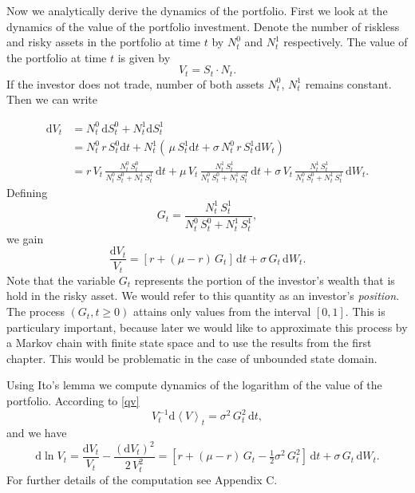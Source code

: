 Now we analytically derive the dynamics of the portfolio. First we look at the dynamics of the value of the portfolio investment. Denote the number of riskless and risky assets in the portfolio at time $t$ by $N^0_t$ and $N^1_t$ respectively. The value of the portfolio at time $t$ is given by
\[V_t=S_t\cdot N_t.\]
If the investor does not trade, number of both assets $N^0_t$, $N^1_t$ remains constant. Then we can write 

\begin{align*}
\mathrm{d}V_t &=N_t^0\,\mathrm{d}S_t^0+N_t^1\mathrm{d}S_t^1\\
&=N_t^0\,r\,S_t^0\mathrm{d}t + N_t^1(\,\mu\,S_t^1\mathrm{d}t + \sigma\,N_t^0\,r\,S_t^1\mathrm{d}W_t)\\
&=r \,V_t\,\frac{N^0_t\,S_t^0}{N_t^0\,S_t^0 + N_t^1\,S_t^1}\,\mathrm{d}t+\mu\,V_t\,\frac{N^1_t\,S_t^1}{N_t^0\,S_t^0 + N_t^1\,S_t^1}\,\mathrm{d}t
  +\sigma\,V_t\,\frac{N^1_t\,S_t^1}{N_t^0\,S_t^0 + N_t^1\,S_t^1}\,\mathrm{d}W_t.
\end{align*}
Defining
\begin{equation}
\label{Gdef}
G_t=\frac{N^1_t\,S_t^1}{N_t^0\,S_t^0 + N_t^1\,S_t^1},
\end{equation}
we gain
\begin{equation}
\label{qv}
\frac{\mathrm{d}V_t}{V_t}=[r+(\mu-r)\,G_t]\,\mathrm{d}t+\sigma\,G_t\,\mathrm{d}W_t.
\end{equation}
Note that the variable $G_t$ represents the portion of the investor's wealth that is hold in the risky asset. We would refer to this quantity as an investor's \textit{position}. The process $(G_t, t\geq0)$ attains only values from the interval $[0,1]$. This is particulary important, because later we would like to approximate this process by a Markov chain with finite state space and to use the results from the first chapter. This would be problematic in the case of unbounded state domain.

Using Ito's lemma we compute dynamics of the logarithm of the value of the portfolio. According to \eqref{qv} %
\[V_t^{-1}\mathrm{d}\left\langle V\right\rangle_t=\sigma^2\,G_t^{2}\,\mathrm{d}t,\] 
and we have  %
\begin{equation}
\mathrm{d}\ln V_t =\frac{\mathrm{d}V_t}{V_t}-\frac{(\mathrm{d}V_t)^2}{2\,V_t^2}=[r+(\mu-r)\,G_t-\tfrac{1}{2}\sigma^2\,G_t^2 ]\,\mathrm{d}t+\sigma\,G_t\,\mathrm{d}W_t.
\end{equation}
For further details of the computation see Appendix C.

